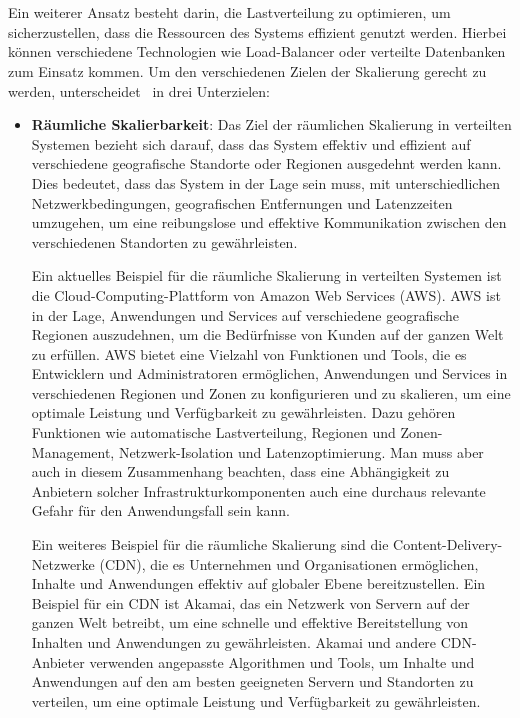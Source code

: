 \documentclass[../vs-script-first-v01.tex]{subfiles}
\begin{document}
\\\\
Ein weiterer Ansatz besteht darin, die Lastverteilung zu optimieren, um sicherzustellen, dass die Ressourcen des Systems effizient genutzt werden. Hierbei können verschiedene Technologien wie Load-Balancer oder verteilte Datenbanken zum Einsatz kommen. Um den verschiedenen Zielen der Skalierung gerecht zu werden, unterscheidet~\cite{tanenbaum2017distributed} in drei Unterzielen:
\begin{itemize}
\item \textbf{Räumliche Skalierbarkeit}: Das Ziel der räumlichen Skalierung in verteilten Systemen bezieht sich darauf, dass das System effektiv und effizient auf verschiedene geografische Standorte oder Regionen ausgedehnt werden kann. Dies bedeutet, dass das System in der Lage sein muss, mit unterschiedlichen Netzwerkbedingungen, geografischen Entfernungen und Latenzzeiten umzugehen, um eine reibungslose und effektive Kommunikation zwischen den verschiedenen Standorten zu gewährleisten.

Ein aktuelles Beispiel für die räumliche Skalierung in verteilten Systemen ist die Cloud-Computing-Plattform von Amazon Web Services (AWS). AWS ist in der Lage, Anwendungen und Services auf verschiedene geografische Regionen auszudehnen, um die Bedürfnisse von Kunden auf der ganzen Welt zu erfüllen. AWS bietet eine Vielzahl von Funktionen und Tools, die es Entwicklern und Administratoren ermöglichen, Anwendungen und Services in verschiedenen Regionen und Zonen zu konfigurieren und zu skalieren, um eine optimale Leistung und Verfügbarkeit zu gewährleisten. Dazu gehören Funktionen wie automatische Lastverteilung, Regionen und Zonen-Management, Netzwerk-Isolation und Latenzoptimierung. Man muss aber auch in diesem Zusammenhang beachten, dass eine Abhängigkeit zu Anbietern solcher Infrastrukturkomponenten auch eine durchaus relevante Gefahr für den Anwendungsfall sein kann.

Ein weiteres Beispiel für die räumliche Skalierung sind die Content-Delivery-Netzwerke (CDN), die es Unternehmen und Organisationen ermöglichen, Inhalte und Anwendungen effektiv auf globaler Ebene bereitzustellen. Ein Beispiel für ein CDN ist Akamai, das ein Netzwerk von Servern auf der ganzen Welt betreibt, um eine schnelle und effektive Bereitstellung von Inhalten und Anwendungen zu gewährleisten. Akamai und andere CDN-Anbieter verwenden angepasste Algorithmen und Tools, um Inhalte und Anwendungen auf den am besten geeigneten Servern und Standorten zu verteilen, um eine optimale Leistung und Verfügbarkeit zu gewährleisten.


\end{itemize}
\end{document}
